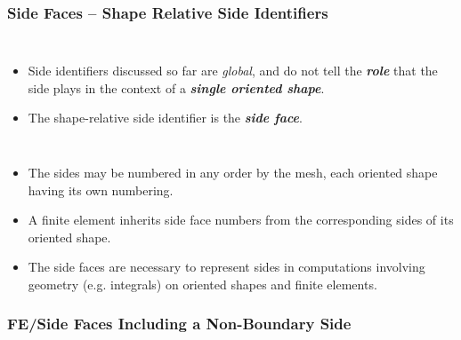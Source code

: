 \documentclass{beamer}
\begin{document}
\begin{frame}
  \frametitle{Side Faces -- Shape Relative Side Identifiers}
  \begin{columns}
      \begin{itemize}[<+->]
        \item Side identifiers discussed so far are \emph{global}, and do not tell the \emph{\textbf{role}} that the side plays
          in the context of a \emph{\textbf{single oriented shape}}.
        \item The shape-relative side identifier is the \emph{\textbf{side face}}.
      \end{itemize}
       {}
               {}
  \end{columns}
  \begin{itemize}[<+->]
    \item The sides may be numbered in any order by the mesh, each oriented shape having its own numbering.
    \item A finite element inherits side face numbers from the corresponding sides of its oriented shape.
    \item The side faces are necessary to represent sides in computations involving geometry (e.g. integrals)
      on oriented shapes and finite elements.
  \end{itemize}
\end{frame}
 
\subsubsection{FE/Side Faces Including a Non-Boundary Side}
\end{document}
